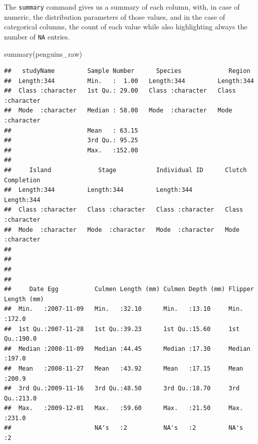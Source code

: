 \documentclass[
]{book}
\newenvironment{Shaded}{\begin{snugshade}}{\end{snugshade}}
\newcommand{\FunctionTok}[1]{\textcolor[rgb]{0.00,0.00,0.00}{#1}}
\newcommand{\NormalTok}[1]{#1}
\begin{document}
The \texttt{summary} command gives us a summary of each column, with, in case of numeric, the distribution parameters of those values, and in the case of categorical columns, the count of each value while also highlighting always the number of \texttt{NA} entries.

\begin{Shaded}
\begin{Highlighting}[]
\FunctionTok{summary}\NormalTok{(penguins\_raw)}
\end{Highlighting}
\end{Shaded}

\begin{verbatim}
##   studyName         Sample Number      Species             Region         
##  Length:344         Min.   :  1.00   Length:344         Length:344        
##  Class :character   1st Qu.: 29.00   Class :character   Class :character  
##  Mode  :character   Median : 58.00   Mode  :character   Mode  :character  
##                     Mean   : 63.15                                        
##                     3rd Qu.: 95.25                                        
##                     Max.   :152.00                                        
##                                                                           
##     Island             Stage           Individual ID      Clutch Completion 
##  Length:344         Length:344         Length:344         Length:344        
##  Class :character   Class :character   Class :character   Class :character  
##  Mode  :character   Mode  :character   Mode  :character   Mode  :character  
##                                                                             
##                                                                             
##                                                                             
##                                                                             
##     Date Egg          Culmen Length (mm) Culmen Depth (mm) Flipper Length (mm)
##  Min.   :2007-11-09   Min.   :32.10      Min.   :13.10     Min.   :172.0      
##  1st Qu.:2007-11-28   1st Qu.:39.23      1st Qu.:15.60     1st Qu.:190.0      
##  Median :2008-11-09   Median :44.45      Median :17.30     Median :197.0      
##  Mean   :2008-11-27   Mean   :43.92      Mean   :17.15     Mean   :200.9      
##  3rd Qu.:2009-11-16   3rd Qu.:48.50      3rd Qu.:18.70     3rd Qu.:213.0      
##  Max.   :2009-12-01   Max.   :59.60      Max.   :21.50     Max.   :231.0      
##                       NA's   :2          NA's   :2         NA's   :2          

\end{verbatim}
\end{document}
